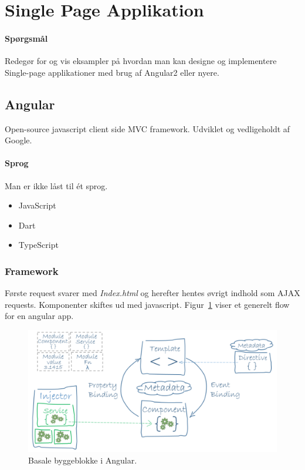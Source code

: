 \section{Single Page Applikation}

\paragraph{Spørgsmål}
Redegør for og vis eksampler på hvordan man kan designe	og implementere Single-page applikationer med brug af	Angular2 eller nyere.

\subsection{Angular}
Open-source javascript client side MVC framework. Udviklet og vedligeholdt af Google.

\paragraph{Sprog} Man er ikke låst til ét sprog.

\begin{multicols}{5}
	\begin{itemize}
		\item JavaScript
		\item Dart
		\item TypeScript
	\end{itemize}
\end{multicols}


\subsubsection{Framework}
Første request svarer med \textit{Index.html} og herefter hentes øvrigt indhold som AJAX requests. Komponenter skiftes ud med javascript. Figur~\ref{fig:ng-basics} viser et generelt flow for en angular app.

\begin{figure}[H]
	\centering
	\includegraphics[width=\linewidth]{figs/ng-basics}
	\caption{Basale byggeblokke i Angular.}
	\label{fig:ng-basics}
\end{figure}

